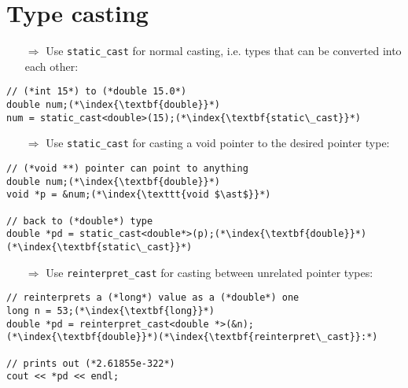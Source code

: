 \documentclass[10pt]{article}
\begin{document}
\section{Type casting}
\small
\begin{enumerate}
\item[$\Rightarrow$] Use \texttt{static\_cast} for normal casting, i.e. types that can be converted into each other:
\end{enumerate}
\begin{lstlisting}
// (*int 15*) to (*double 15.0*)
double num;(*\index{\textbf{double}}*)
num = static_cast<double>(15);(*\index{\textbf{static\_cast}}*)
\end{lstlisting}
\begin{enumerate}
\item[$\Rightarrow$] Use \texttt{static\_cast} for casting a void pointer to the desired pointer type:
\end{enumerate}
\begin{lstlisting}
// (*void **) pointer can point to anything
double num;(*\index{\textbf{double}}*)
void *p = &num;(*\index{\texttt{void $\ast$}}*) 

// back to (*double*) type
double *pd = static_cast<double*>(p);(*\index{\textbf{double}}*)(*\index{\textbf{static\_cast}}*)
\end{lstlisting}
\begin{enumerate}
\item[$\Rightarrow$] Use \texttt{reinterpret\_cast} for casting between unrelated pointer types:
\end{enumerate}
\begin{lstlisting}
// reinterprets a (*long*) value as a (*double*) one
long n = 53;(*\index{\textbf{long}}*)
double *pd = reinterpret_cast<double *>(&n);(*\index{\textbf{double}}*)(*\index{\textbf{reinterpret\_cast}}:*)

// prints out (*2.61855e-322*)
cout << *pd << endl;

\end{lstlisting}
%
%
\end{document}
